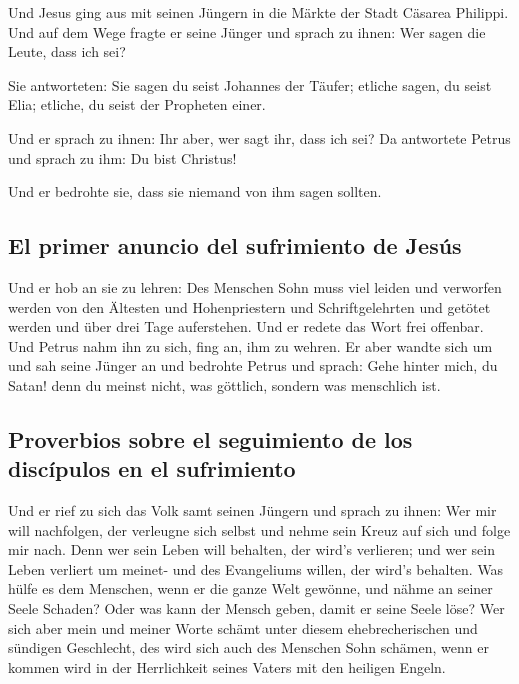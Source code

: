  Und Jesus ging aus mit seinen Jüngern in die Märkte der
Stadt Cäsarea Philippi. Und auf dem Wege fragte er seine Jünger und
sprach zu ihnen: Wer sagen die Leute, dass ich sei?

 Sie antworteten: Sie sagen du seist Johannes der Täufer;
etliche sagen, du seist Elia; etliche, du seist der Propheten einer.

 Und er sprach zu ihnen: Ihr aber, wer sagt ihr, dass ich
sei? Da antwortete Petrus und sprach zu ihm: Du bist Christus!

 Und er bedrohte sie, dass sie niemand von ihm sagen
sollten.

\hypertarget{el-primer-anuncio-del-sufrimiento-de-jesuxfas}{%
\subsection{El primer anuncio del sufrimiento de
Jesús}\label{el-primer-anuncio-del-sufrimiento-de-jesuxfas}}

 Und er hob an sie zu lehren: Des Menschen Sohn muss viel
leiden und verworfen werden von den Ältesten und Hohenpriestern und
Schriftgelehrten und getötet werden und über drei Tage auferstehen.
 Und er redete das Wort frei offenbar. Und Petrus nahm
ihn zu sich, fing an, ihm zu wehren.  Er aber wandte sich
um und sah seine Jünger an und bedrohte Petrus und sprach: Gehe hinter
mich, du Satan! denn du meinst nicht, was göttlich, sondern was
menschlich ist.

\hypertarget{proverbios-sobre-el-seguimiento-de-los-discuxedpulos-en-el-sufrimiento}{%
\subsection{Proverbios sobre el seguimiento de los discípulos en el
sufrimiento}\label{proverbios-sobre-el-seguimiento-de-los-discuxedpulos-en-el-sufrimiento}}

 Und er rief zu sich das Volk samt seinen Jüngern und
sprach zu ihnen: Wer mir will nachfolgen, der verleugne sich selbst und
nehme sein Kreuz auf sich und folge mir nach.  Denn wer
sein Leben will behalten, der wird's verlieren; und wer sein Leben
verliert um meinet- und des Evangeliums willen, der wird's behalten.
 Was hülfe es dem Menschen, wenn er die ganze Welt
gewönne, und nähme an seiner Seele Schaden?  Oder was
kann der Mensch geben, damit er seine Seele löse?  Wer
sich aber mein und meiner Worte schämt unter diesem ehebrecherischen und
sündigen Geschlecht, des wird sich auch des Menschen Sohn schämen, wenn
er kommen wird in der Herrlichkeit seines Vaters mit den heiligen
Engeln.

